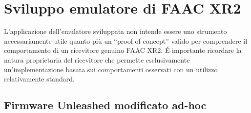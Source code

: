 \chapter{Sviluppo emulatore di FAAC XR2}
\label{cha:development}

L’applicazione dell’emulatore sviluppata non intende essere uno strumento necessariamente utile quanto più un “proof of concept” valido per comprendere il comportamento di un ricevitore genuino FAAC XR2. É importante ricordare la natura proprietaria del ricevitore che permette esclusivamente un’implementazione basata sui comportamenti osservati con un utilizzo relativamente standard.

\section{Firmware Unleashed modificato ad-hoc}
\label{sec:unleashed_mod}

